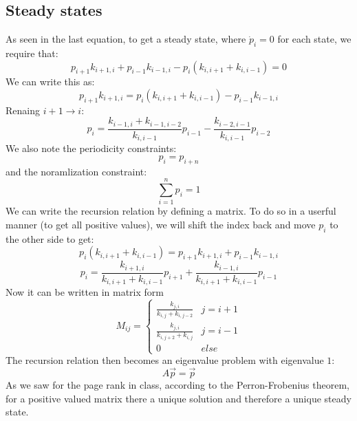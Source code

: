 \documentclass{article}
\begin{document}
\subsection{Steady states}
As seen in the last equation, to get a steady state, where $\dot{p}_i = 0$ for each state, we require that:
\begin{equation}
    p_{i + 1}k_{i + 1,i} + p_{i - 1}k_{i - 1,i} - p_i(k_{i,i + 1} + k_{i,i - 1}) = 0
\end{equation}
We can write this as:
\begin{equation}
    p_{i + 1}k_{i + 1,i} = p_i(k_{i,i + 1} + k_{i,i - 1}) - p_{i - 1}k_{i - 1,i}
\end{equation}
Renaing $i+1 \rightarrow i$:
\begin{equation}
    \boxed{p_{i} = \frac{k_{i - 1,i} + k_{i - 1,i - 2}}{k_{i,i - 1}}p_{i - 1} - \frac{k_{i - 2,i - 1}}{k_{i,i - 1}}p_{i - 2}}
\end{equation}
We also note the periodicity constraints:
\begin{equation}
    \boxed{p_i = p_{i + n}}
\end{equation}
and the noramlization constraint:
\begin{equation}
    \boxed{\sum_{i=1}^n p_i = 1}
\end{equation}
We can write the recursion relation by defining a matrix. To do so in a userful manner (to get all positive values), we will shift the index back and move $p_i$ to the other side to get:
\begin{equation}
    p_i(k_{i,i + 1} + k_{i,i - 1}) = p_{i + 1}k_{i + 1,i} + p_{i - 1}k_{i - 1,i}
\end{equation}
\begin{equation}
    p_i = \frac{k_{i + 1,i}}{k_{i,i + 1} + k_{i,i - 1}}p_{i + 1} + \frac{k_{i - 1,i}}{k_{i,i + 1} + k_{i,i - 1}}p_{i - 1}
\end{equation}
Now it can be written in matrix form
\begin{equation}
    M_{ij} = \begin{cases}
        \frac{k_{j,i}}{k_{i, j} + k_{i,j - 2}} & j = i + 1 \\
        \frac{k_{j,i}}{k_{i,j + 2} + k_{i,j}} & j = i - 1 \\
        0 & else
    \end{cases}
\end{equation}
The recursion relation then becomes an eigenvalue problem with eigenvalue $1$:
\begin{equation}
    A \vec{p} = \vec{p}
\end{equation}
As we saw for the page rank in class, according to the Perron-Frobenius theorem, for a positive valued matrix there a unique solution and therefore a unique steady state.
\end{document}
